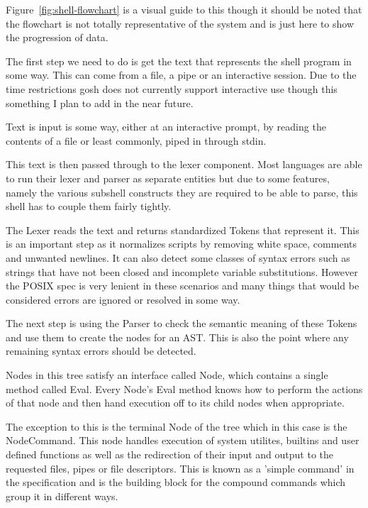Figure~\ref{fig:shell-flowchart} is a visual guide to this though it should be noted that the flowchart is not totally representative of the system and is just here to show the progression of data.


The first step we need to do is get the text that represents the shell program in some way.
This can come from a file, a pipe or an interactive session.
Due to the time restrictions gosh does not currently support interactive use though this something I plan to add in the near future.



Text is input is some way, either at an interactive prompt, by reading the contents of a file or least commonly, piped in through stdin.

This text is then passed through to the lexer component.
Most languages are able to run their lexer and parser as separate entities but due to some  features, namely the various subshell constructs they are required to be able to parse, this shell has to couple them fairly tightly.

The Lexer reads the text and returns standardized Tokens that represent it.
This is an important step as it normalizes scripts by removing white space, comments and unwanted newlines.
It can also detect some classes of syntax errors such as strings that have not been closed and incomplete variable substitutions.
However the POSIX spec is very lenient in these scenarios and many things that would be considered errors are ignored or resolved in some way. %

The next step is using the Parser to check the semantic meaning of these Tokens and use them to create the nodes for an AST.
This is also the point where any remaining syntax errors should be detected.

Nodes in this tree satisfy an interface called Node, which contains a single method called Eval.
Every Node's Eval method knows how to perform the actions of that node and then hand execution off to its child nodes when appropriate.

The exception to this is the terminal Node of the tree which in this case is the NodeCommand.
This node handles execution of system utilites, builtins and user defined functions as well as the redirection of their input and output to the requested files, pipes or file descriptors.
This is known as a 'simple command' in the specification and is the building block for the compound commands which group it in different ways.

